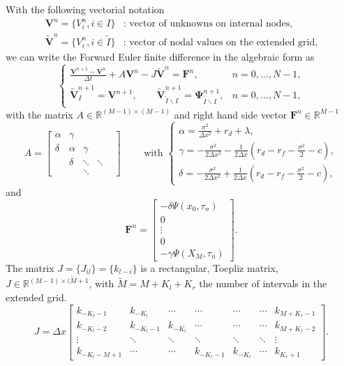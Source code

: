 With the following vectorial notation 
\begin{align*}
\mathbf{V}^n = \{V_i^n, i \in I\} & \text{: vector of unknowns on internal nodes},\\
\mathbf{\tilde{V}}^n = \{V_i^n, i \in \tilde{I}\}& \text{: vector of nodal values on the extended grid},
\end{align*}
we can write the Forward Euler finite difference in the algebraic form as
$$\begin{cases}
\displaystyle{\frac{\mathbf{V}^{n+1}-\mathbf{V}^n}{\Delta t}+ A\mathbf{V}^n-J\mathbf{\tilde{V}}^n = \mathbf{F}^n},&n = 0,\ldots, N-1,\\
\mathbf{\tilde{V}}_I^{n+1} = \mathbf{V}^{n+1},\qquad \mathbf{\tilde{V}}_{\tilde{I}\backslash I}^{n+1}=\mathbf{\Psi}_{\tilde{I}\backslash I}^{n+1}, &n = 0,\ldots, N-1,
\end{cases}$$
with the matrix $A\in\mathbb{R}^{(M-1)\times(M-1)}$ and right hand side vector $\mathbf{F}^n\in\mathbb{R}^{M-1}$
$$ A = \left[\begin{matrix} 
\alpha & \gamma & & &\\
\delta & \alpha & \gamma & & \\
& \delta & \ddots & \ddots \\
& & \ddots & & 
\end{matrix}\right]
\qquad\text{ with }
\begin{cases}
\alpha = \frac{\sigma^2}{\Delta x^2}+r_d +\lambda,\\
\gamma = -\frac{\sigma^2}{2\Delta x^2}-\frac{1}{2\Delta x}\left(r_d-r_f-\frac{\sigma^2}{2}-c\right),\\
\delta = -\frac{\sigma^2}{2\Delta x^2}+\frac{1}{2\Delta x}\left(r_d-r_f-\frac{\sigma^2}{2}-c\right),
\end{cases}$$
and
$$\mathbf{F}^n = \left[\begin{matrix}
-\delta \Psi(x_0, \tau_n)\\
0\\
\vdots\\
0\\
-\gamma\Psi(X_M,\tau_n)
\end{matrix}\right].$$
The matrix $J=\{J_{il}\}=\{k_{l-i}\}$ is a rectangular, Toepliz matrix, $J\in\mathbb{R}^{(M-1)\times(\tilde{M}+1}$, with $\tilde{M}=M+K_l+K_r$ the number of intervals in the extended grid.
$$J = \Delta x \left[
\begin{matrix}
k_{-K_l-1} & k_{-K_l} & \cdots & \cdots &\cdots &\cdots & k_{M+K_r-1}\\
k_{-K_l-2} & k_{-K_l-1} & k_{-K_l} &\cdots &\cdots &\cdots & k_{M+K_r-2}\\
\vdots & \ddots &\ddots &\ddots &\ddots & \ddots & \vdots\\
k_{-K_l-M+1} & \cdots & \cdots & k_{-K_l-1} & k_{-K_l} &\cdots & k_{K_r+1}
\end{matrix}
\right].$$

